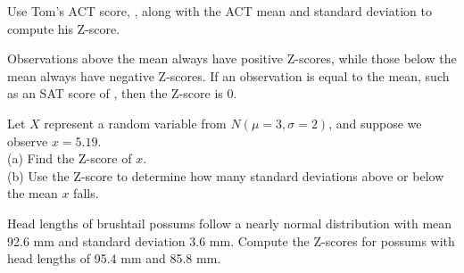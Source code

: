 \begin{exercisewrap}
\begin{nexercise}
Use Tom's ACT score, \tomsatscore{}, along with the ACT mean and
standard deviation to compute his Z-score.\footnotemark{}
\end{nexercise}
\end{exercisewrap}

Observations above the mean always have positive Z-scores,
while those below the mean always have negative Z-scores.
If an observation is equal to the mean,
such as an SAT score of \satmean{}, then the Z-score is $0$.

\begin{exercisewrap}
\begin{nexercise}
Let $X$ represent a random variable from $N(\mu=3, \sigma=2)$,
and suppose we observe $x=5.19$. \\
(a)
    Find the Z-score of $x$. \\
(b)
    Use the Z-score to determine how many standard deviations
    above or below the mean $x$ falls.\footnotemark{}
\end{nexercise}
\end{exercisewrap}

\begin{exercisewrap}
\begin{nexercise} \label{headLZScore}
Head lengths of brushtail possums follow a nearly normal
distribution with mean 92.6 mm and standard deviation 3.6 mm.
Compute the Z-scores for possums with head lengths of 95.4 mm
and 85.8 mm.\footnotemark{}
\end{nexercise}
\end{exercisewrap}

